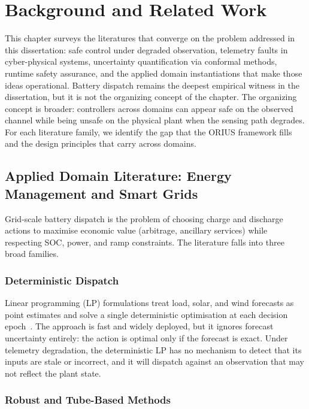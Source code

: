 
\chapter{Background and Related Work}
\label{ch:related-work}

This chapter surveys the literatures that converge on the problem
addressed in this dissertation: safe control under degraded observation,
telemetry faults in cyber-physical systems, uncertainty quantification via
conformal methods, runtime safety assurance, and the applied domain
instantiations that make those ideas operational.  Battery dispatch remains
the deepest empirical witness in the dissertation, but it is not the
organizing concept of the chapter.  The organizing concept is broader:
controllers across domains can appear safe on the observed channel while
being unsafe on the physical plant when the sensing path degrades.  For
each literature family, we identify the gap that the ORIUS framework fills
and the design principles that carry across domains.

\section{Applied Domain Literature: Energy Management and Smart Grids}

Grid-scale battery dispatch is the problem of choosing charge and
discharge actions to maximise economic value (arbitrage, ancillary
services) while respecting SOC, power, and ramp constraints.  The
literature falls into three broad families.

\subsection{Deterministic Dispatch}

Linear programming (LP) formulations treat load, solar, and wind
forecasts as point estimates and solve a single deterministic optimisation
at each decision epoch~\cite{xu2020optimal}.  The approach is fast and
widely deployed, but it ignores forecast uncertainty entirely: the action
is optimal only if the forecast is exact.  Under telemetry degradation,
the deterministic LP has no mechanism to detect that its inputs are stale
or incorrect, and it will dispatch against an observation that may not
reflect the plant state.

\subsection{Robust and Tube-Based Methods}

